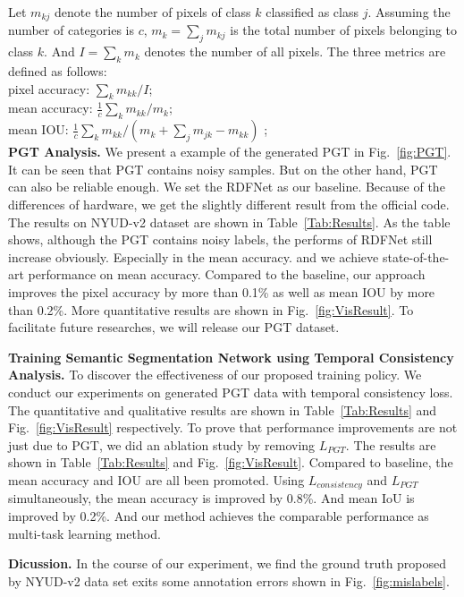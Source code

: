 %
Let $m_{kj}$ denote the number of pixels of class ${k}$ classified as class ${j}$.
%
Assuming the number of categories is $c$, $m_{k} = \sum_{j}m_{kj}$ is the total number of pixels belonging to class $k$. 
%
And $I = \sum_{k}m_{k}$ denotes the number of all pixels.
%
The three metrics are defined as follows:\\
\renewcommand{\baselinestretch}{1.0}\indent\text{---} pixel accuracy: $\sum_{k}m_{kk}/I$;\\
\indent\text{---} mean accuracy: $\frac{1}{c}\sum_{k}m_{kk}/m_{k}$;\\
\indent\text{---} mean IOU: $\frac{1}{c}\sum_{k}m_{kk}/(m_{k}+\sum_{j}m_{jk}-m_{kk})$ ;\\


{\bf PGT Analysis.} We present a example of the generated PGT in Fig.~\ref{fig:PGT}.
%
It can be seen that PGT contains noisy samples. 
%
But on the other hand, PGT can also be reliable enough.
%
We set the RDFNet as our baseline.
%
Because of the differences of hardware, we get the slightly different result from the official code.
%
The results on NYUD-v2 dataset are shown in Table~\ref{Tab:Results}.
%
As the table shows, although the PGT contains noisy labels, the performs of RDFNet still increase obviously. 
%
Especially in the mean accuracy.
%
and we achieve state-of-the-art performance on mean accuracy.
%
Compared to the baseline, our approach improves the pixel accuracy by more than 0.1\% as well as mean IOU by more than 0.2\%.
%
More quantitative results are shown in Fig.~\ref{fig:VisResult}.
%
To facilitate future researches, we will release our PGT dataset.

{\bf{Training Semantic Segmentation Network using Temporal Consistency Analysis.}} 
To discover the effectiveness of our proposed training policy. 
%
We conduct our experiments on generated PGT data with temporal consistency loss.
%
The quantitative and qualitative results are shown in Table~\ref{Tab:Results} and
Fig.~\ref{fig:VisResult} respectively.
%
To prove that performance improvements are not just due to PGT, we did an ablation study by removing $L_{PGT}$.
%
The results are shown in Table~\ref{Tab:Results} and Fig.~\ref{fig:VisResult}.
%
Compared to baseline, the mean accuracy and IOU are all been promoted.
%
Using $L_{consistency}$ and $L_{PGT}$ simultaneously, the mean accuracy is improved by 0.8\%.
%
And mean IoU is improved by 0.2\%.
%
And our method achieves the comparable performance as multi-task learning method.

{\bf{Dicussion.}} In the course of our experiment, we find the ground truth proposed by NYUD-v2 data set exits some annotation errors shown in Fig.~\ref{fig:mislabels}.

